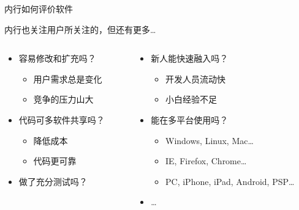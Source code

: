 \begin{frame}{内行如何评价软件}
  \begin{block}{}
    内行也关注用户所关注的，但还有更多\dots
  \end{block}
  \begin{columns}[t]
    \begin{column}{6.1cm}
      \begin{itemize}
        \pause
        \item 容易修改和扩充吗？\structure{[扩展性]}
          \begin{itemize}
            \item 用户需求总是变化
            \item 竞争的压力山大
          \end{itemize}
        \pause
        \item 代码可多软件共享吗？\structure{[复用性]}
          \begin{itemize}
            \item 降低成本
            \item 代码更可靠
          \end{itemize}
        \pause
        \item 做了充分测试吗？\structure{[可测性]}
        \pause
      \end{itemize}
    \end{column}
    \begin{column}{6.1cm}
      \begin{itemize}
        \item 新人能快速融入吗？\structure{[可维护]}
          \begin{itemize}
            \item 开发人员流动快
            \item 小白经验不足
          \end{itemize}
        \pause
        \item 能在多平台使用吗？\structure{[可移植性]}
          \begin{itemize}
            \pause
            \item Windows, Linux, Mac\dots
            \pause
            \item IE, Firefox, Chrome\dots
            \pause
            \item PC, iPhone, iPad, Android, PSP\dots
          \end{itemize}
        \pause
        \item \dots
      \end{itemize}
    \end{column}
  \end{columns}
\end{frame}

